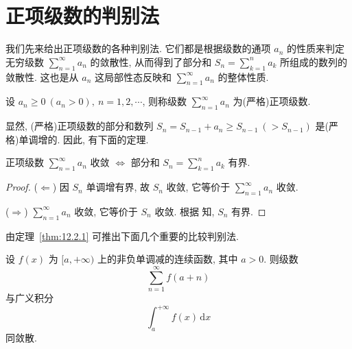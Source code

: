 \section{正项级数的判别法}\label{sec:12.2}

我们先来给出正项级数的各种判别法. 它们都是根据级数的通项 $a_{n}$ 的性质来判定无穷级数 $\sum_{n=1}^{\infty}a_{n}$ 的敛散性, 从而得到了部分和 $S_{n}=\sum_{k=1}^{n}a_{k}$ 所组成的数列的敛散性. 这也是从 $a_{n}$ 这局部性态反映和 $\sum_{n=1}^{\infty}a_{n}$ 的整体性质.

\begin{definition}\label{def:12.2.1}
设 $a_{n}\geqslant0\ (a_{n}>0),\ n=1,2,\cdots$, 则称级数 $\sum_{n=1}^{\infty}a_{n}$ 为(严格)正项级数.

显然, (严格)正项级数的部分和数列 $S_{n}=S_{n-1}+a_{n}\geqslant S_{n-1}\ (>S_{n-1})$ 是(严格)单调增的. 因此, 有下面的定理.
\end{definition}

\begin{theorem}\label{thm:12.2.1}
正项级数 $\sum_{n=1}^{\infty}a_{n}$ 收敛 $\Leftrightarrow$ 部分和 $S_{n}=\sum_{k=1}^{n}a_{k}$ 有界.
\end{theorem}

\begin{proof}
($\Leftarrow$) 因 $S_{n}$ 单调增有界, 故 $S_{n}$ 收敛, 它等价于 $\sum_{n=1}^{\infty}a_{n}$ 收敛.

($\Rightarrow$) $\sum_{n=1}^{\infty}a_{n}$ 收敛, 它等价于 $S_{n}$ 收敛. 根据 知, $S_{n}$ 有界.
\end{proof}

由定理~\ref{thm:12.2.1} 可推出下面几个重要的比较判别法.

\begin{theorem}\label{thm:12.2.2}
设 $f(x)$ 为 $[a,+\infty)$ 上的非负单调减的连续函数, 其中 $a>0$. 则级数
\[
  \sum_{n=1}^{\infty}f(a+n)
\]
与广义积分
\[
  \int_{a}^{+\infty}f(x)\,\mathrm{d}x
\]
同敛散.
\end{theorem}

